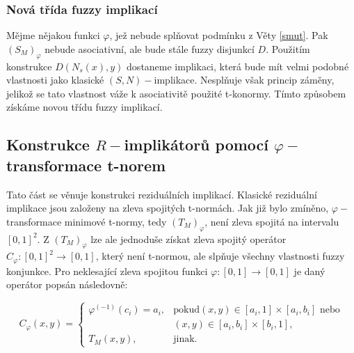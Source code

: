 \subsubsection{Nová třída fuzzy implikací}
Mějme nějakou funkci $\varphi$, jež nebude spl\v novat podmínku z Věty \ref{smut}. Pak $(S_M)_{\varphi}$ nebude asociativní, ale bude stále fuzzy disjunkcí $D.$ Použitím konstrukce $D(N_s(x),y)$ dostaneme implikaci, která bude mít velmi podobné vlastnosti jako klasické $(S,N)-$implikace. Nespl\v nuje však princip záměny, jelikož se tato vlastnost váže k asociativitě použité t-konormy. Tímto způsobem získáme novou třídu fuzzy implikací.


\subsection{Konstrukce $R-$implik\'ator\r u pomoc\'i $\varphi-$transformace t-norem}
Tato část se věnuje konstrukci reziduálních implikací. Klasické reziduální implikace jsou založeny na zleva spojitých t-normách. Jak již bylo zmíněno, $\varphi-$transformace minimové t-normy, tedy $(T_M)_\varphi$, není zleva spojitá na intervalu $[0,1]^2$. Z $(T_M)_\varphi$ lze ale jednoduše získat zleva spojitý operátor $C_\varphi:[0,1]^2 \to [0,1]$, který není t-normou, ale slp\v nuje všechny vlastnosti fuzzy konjunkce. Pro neklesající zleva spojitou funkci $\varphi: [0,1] \to [0,1]$ je daný operátor popsán následovně:\cite{mitav}

\begin{equation} \label{rez}
    C_{\varphi}(x,y) = \begin{cases} \varphi^{(-1)}(c_i)=a_i, &\mbox {pokud
$(x,y)\in [a_i,1]\times[a_i,b_i]$ nebo}
\\ & (x,y)\in [a_i,b_i]\times[b_i,1],
\\ T_M(x,y), &\mbox {jinak.}
\end{cases} 
\end{equation} 



